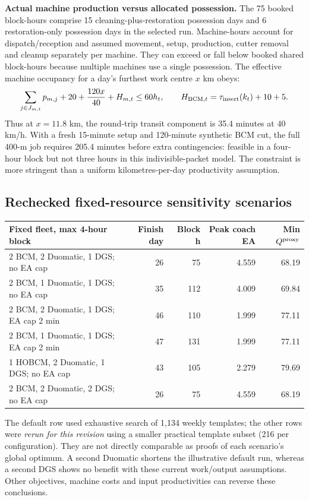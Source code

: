\documentclass[10pt,a4paper]{article}
\begin{document}
\textbf{Actual machine production versus allocated possession.} The 75 booked block-hours comprise 15 cleaning-plus-restoration possession days and 6 restoration-only possession days in the selected run. Machine-hours account for dispatch/reception and assumed movement, setup, production, cutter removal and cleanup separately per machine. They can exceed or fall below booked shared block-hours because multiple machines use a single possession. The effective machine occupancy for a day's furthest work centre $x$ km obeys:
\begin{equation}
\sum_{j\in J_{m,t}}p_{m,j} + 20 + \frac{120x}{40} + H_{m,t}\le 60h_t,
\qquad H_{{\rm BCM},t}=\tau_{\rm insert}(k_t)+10+5.
\end{equation}
Thus at $x=11.8$ km, the round-trip transit component is 35.4 minutes at 40 km/h. With a fresh 15-minute setup and 120-minute synthetic BCM cut, the full 400-m job requires 205.4 minutes before extra contingencies: feasible in a four-hour block but not three hours in this indivisible-packet model. The constraint is more stringent than a uniform kilometres-per-day productivity assumption.

\subsection{Rechecked fixed-resource sensitivity scenarios}
\begin{center}\scriptsize\begin{tabular}{p{.43\linewidth}rrrr}\toprule
Fixed fleet, max 4-hour block & Finish day & Block h & Peak coach EA & Min $Q^{\rm proxy}$\\\midrule
2 BCM, 2 Duomatic, 1 DGS; no EA cap & 26 & 75 & 4.559 & 68.19\\
2 BCM, 1 Duomatic, 1 DGS; no EA cap & 35 & 112 & 4.009 & 69.84\\
2 BCM, 2 Duomatic, 1 DGS; EA cap 2 min & 46 & 110 & 1.999 & 77.11\\
2 BCM, 1 Duomatic, 1 DGS; EA cap 2 min & 47 & 131 & 1.999 & 77.11\\
1 HOBCM, 2 Duomatic, 1 DGS; no EA cap & 43 & 105 & 2.279 & 79.69\\
2 BCM, 2 Duomatic, 2 DGS; no EA cap & 26 & 75 & 4.559 & 68.19\\
\bottomrule\end{tabular}\end{center}
The default row used exhaustive search of 1,134 weekly templates; the other rows were \emph{rerun for this revision} using a smaller practical template subset (216 per configuration). They are not directly comparable as proofs of each scenario's global optimum. A second Duomatic shortens the illustrative default run, whereas a second DGS shows no benefit with these current work/output assumptions. Other objectives, machine costs and input productivities can reverse these conclusions.
\end{document}
